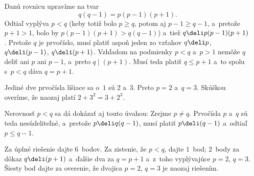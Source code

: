 {%
Danú rovnicu upravíme na tvar
$$
q(q-1)=p(p-1)(p+1).
$$
Odtiaľ vyplýva $p<q$ (keby totiž bolo $p \ge q$, potom aj $p-1 \ge q-1$,
a~pretože $p+1>1$, bolo by $p(p-1)(p+1)>q(q-1)$) a~tiež $q\deli p(p-1)(p+1)$.
Pretože $q$ je prvočíslo, musí platiť aspoň jeden zo vzťahov $q\deli p$, $q\deli(p-1)$, $q\deli(p+1)$.
Vzhľadom na podmienky $p<q$ a~$p>1$ nemôže $q$ deliť ani $p$ ani $p-1$, a~preto $q\mid(p+1)$.
Musí teda platiť $q \le p+1$ a~to spolu s~$p<q$ dáva $q=p+1$.

Jediné dve prvočísla líšiace sa o~$1$ sú $2$ a~$3$. Preto $p=2$ a~$q=3$. Skúškou overíme, že naozaj platí $2+3^2=3+2^3$.

\poznamka
Nerovnosť $p<q$ sa dá dokázať aj touto úvahou: Zrejme $p \ne q$. Prvočísla $p$ a~$q$ sú teda nesúdeliteľné, a~pretože $p\deli q(q-1)$, musí platiť $p\deli(q-1)$ a~odtiaľ $p \le q-1$.


\nobreak\medskip\petit\noindent
Za úplné riešenie dajte 6~bodov.
Za zistenie, že $p<q$, dajte $1$~bod; $2$~body za dôkaz $q\deli(p+1)$ a~ďalšie dva za $q=p+1$ a~z~toho vyplývajúce $p=2$, $q=3$. Šiesty bod dajte za overenie, že dvojica $p=2$, $q=3$ je naozaj riešením.
\endpetit
\bigbreak}

